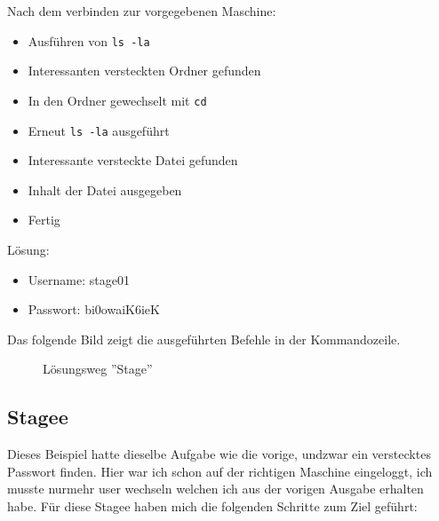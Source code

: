 \documentclass[12pt, a4paper, titlepage, oneside]{scrartcl}
\begin{document}
	Nach dem verbinden zur vorgegebenen Maschine:
	\begin{itemize}
		\item Ausführen von \lstinline{ls -la}

		\item Interessanten versteckten Ordner gefunden

		\item In den Ordner gewechselt mit \lstinline{cd}

		\item Erneut \lstinline{ls -la} ausgeführt

		\item Interessante versteckte Datei gefunden

		\item Inhalt der Datei ausgegeben

		\item Fertig
	\end{itemize}

	Lösung:
	\begin{itemize}
		\item Username: stage01

		\item Passwort: bi0owaiK6ieK
	\end{itemize}
	Das folgende Bild zeigt die ausgeführten Befehle in der Kommandozeile.
	\begin{figure}[h!]
		\centering
		\caption{Lösungsweg ''Stage''}
		\label{fig:stage_solution}
	\end{figure}

	\newpage

	\subsection{Stagee}
	Dieses Beispiel hatte dieselbe Aufgabe wie die vorige, undzwar ein verstecktes
	Passwort finden. Hier war ich schon auf der richtigen Maschine eingeloggt, ich
	musste nurmehr user wechseln welchen ich aus der vorigen Ausgabe erhalten habe.
	Für diese Stagee haben mich die folgenden Schritte zum Ziel geführt:
\end{document}
